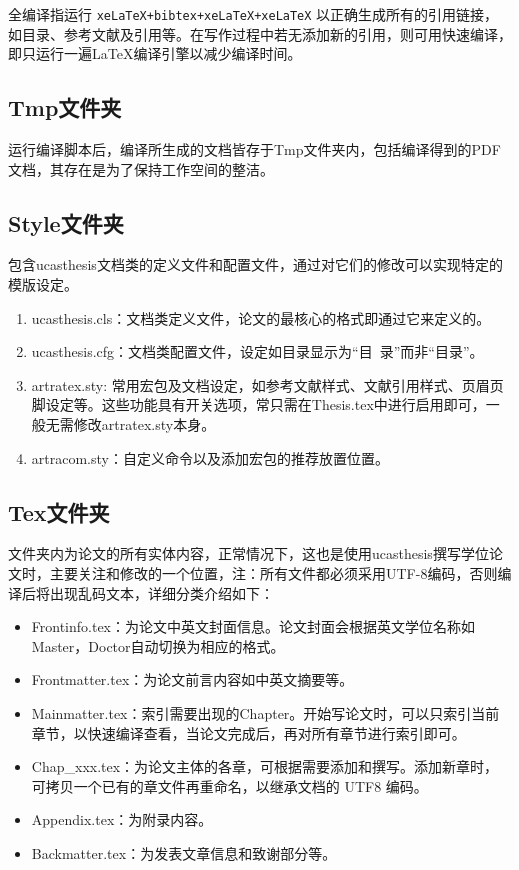 全编译指运行 \verb|xeLaTeX+bibtex+xeLaTeX+xeLaTeX| 以正确生成所有的引用链接，如目录、参考文献及引用等。在写作过程中若无添加新的引用，则可用快速编译，即只运行一遍LaTeX编译引擎以减少编译时间。

\subsection{Tmp文件夹}

运行编译脚本后，编译所生成的文档皆存于Tmp文件夹内，包括编译得到的PDF文档，其存在是为了保持工作空间的整洁。

\subsection{Style文件夹}

包含ucasthesis文档类的定义文件和配置文件，通过对它们的修改可以实现特定的模版设定。

\begin{enumerate}
    \item ucasthesis.cls：文档类定义文件，论文的最核心的格式即通过它来定义的。
    \item ucasthesis.cfg：文档类配置文件，设定如目录显示为“目~录”而非“目录”。
    \item artratex.sty: 常用宏包及文档设定，如参考文献样式、文献引用样式、页眉页脚设定等。这些功能具有开关选项，常只需在Thesis.tex中进行启用即可，一般无需修改artratex.sty本身。
    \item artracom.sty：自定义命令以及添加宏包的推荐放置位置。
\end{enumerate}

\subsection{Tex文件夹}

文件夹内为论文的所有实体内容，正常情况下，这也是使用ucasthesis撰写学位论文时，主要关注和修改的一个位置，注：所有文件都必须采用UTF-8编码，否则编译后将出现乱码文本，详细分类介绍如下：

\begin{itemize}
    \item Frontinfo.tex：为论文中英文封面信息。论文封面会根据英文学位名称如Master，Doctor自动切换为相应的格式。
    \item Frontmatter.tex：为论文前言内容如中英文摘要等。
    \item Mainmatter.tex：索引需要出现的Chapter。开始写论文时，可以只索引当前章节，以快速编译查看，当论文完成后，再对所有章节进行索引即可。
    \item Chap{\_}xxx.tex：为论文主体的各章，可根据需要添加和撰写。添加新章时，可拷贝一个已有的章文件再重命名，以继承文档的 UTF8 编码。
    \item Appendix.tex：为附录内容。
    \item Backmatter.tex：为发表文章信息和致谢部分等。
\end{itemize}

